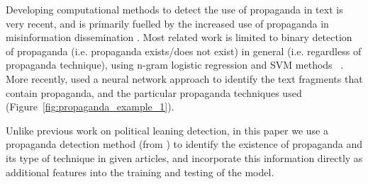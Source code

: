 Developing computational methods to detect the use of propaganda in text is very recent, and is primarily fuelled by the increased use of propaganda in misinformation dissemination \cite{da2020survey}. Most related work is limited to binary detection of propaganda (i.e. propaganda exists/does not exist) in general (i.e. regardless of propaganda technique), using n-gram logistic regression and SVM methods ~\cite{rashkin2017truth,barron2019proppy}. More recently, \citet{da2019fine} used a neural network approach to identify the text fragments that contain propaganda, and the particular propaganda techniques used (Figure~\ref{fig:propaganda_example_1}).

Unlike previous work on political leaning detection, in this paper we use a propaganda detection method (from \citet{da2019fine}) to identify the existence of propaganda and its type of technique in given articles, and incorporate this information directly as additional features into the training and testing of the model.  




